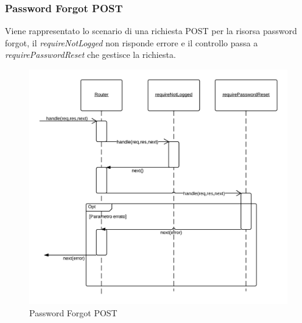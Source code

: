 \subsubsection{Password Forgot POST} 
Viene rappresentato lo scenario di una richiesta POST per la risorsa password forgot, il \emph{requireNotLogged} non risponde errore e il controllo passa a \emph{requirePasswordReset} che gestisce la richiesta.
\begin{figure}[H]
	\begin{center} 
		\includegraphics[scale=0.20]{scenari/Password Forgot POST.png} 
		\caption{Password Forgot POST}
	\end{center} 
\end{figure}

